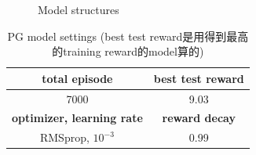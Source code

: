\documentclass[12pt, a4paper]{article}
\begin{document}
\begin{CJK}{UTF8}{bkai}
\begin{figure}[!htb]
\centering
{}
\hfill
{}
\hfill
\caption{Model structures}
\label{fig:f3}
\end{figure}

\begin{table}[!htb]
\centering
\begin{tabular}{|c|c|}
\hline
{\textbf{total episode}} & {\textbf{best test reward}}\\
\hline
{7000} & {9.03}\\
\hline
\hline
{\textbf{optimizer, learning rate}} & {\textbf{reward decay}} \\
\hline
{RMSprop, $10^{-3}$} & {0.99}\\
\hline

\end{tabular} 
\caption{PG model settings (best test reward是用得到最高的training reward的model算的)}
\label{table:1}
\end{table}


\end{CJK}
\end{document}
